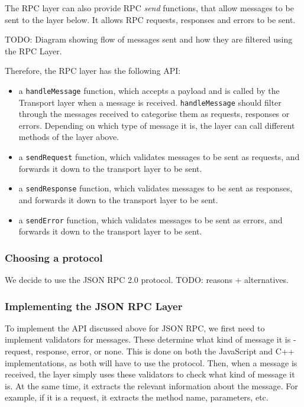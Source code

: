 The RPC layer can also provide RPC \emph{send} functions, that allow messages to be sent to the layer below. It allows RPC requests, responses and errors to be sent.

TODO: Diagram showing flow of messages sent and how they are filtered using the RPC Layer.

Therefore, the RPC layer has the following API:
\begin{itemize}
	\item a \lstinline+handleMessage+ function, which accepts a payload and is called by the Transport layer when a message is received. \lstinline+handleMessage+ should filter through the messages received to categorise them as requests, responses or errors. Depending on which type of message it is, the layer can call different methods of the layer above.
	\item a \lstinline+sendRequest+ function, which validates messages to be sent as requests, and forwards it down to the transport layer to be sent.
	\item a \lstinline+sendResponse+ function, which validates messages to be sent as responses, and forwards it down to the transport layer to be sent.
	\item a \lstinline+sendError+ function, which validates messages to be sent as errors, and forwards it down to the transport layer to be sent.
\end{itemize}

\subsubsection{Choosing a protocol} %
\label{ssub:choosing_a_protocol}
We decide to use the JSON RPC 2.0 protocol. TODO: reasons + alternatives.

\subsubsection{Implementing the JSON RPC Layer} %
\label{ssub:implementing_the_jsonrpc_layer}
To implement the API discussed above for JSON RPC, we first need to implement validators for messages. These determine what kind of message it is - request, response, error, or none. This is done on both the JavaScript and C++ implementations, as both will have to use the protocol. Then, when a message is received, the layer simply uses these validators to check what kind of message it is. At the same time, it extracts the relevant information about the message. For example, if it is a request, it extracts the method name, parameters, etc. 

